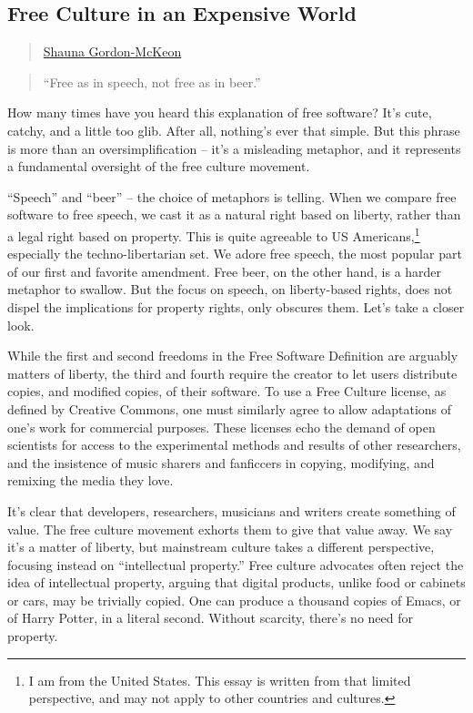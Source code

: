 \subsection{Free Culture in an Expensive
World}\label{free-culture-in-an-expensive-world}

\begin{quote}
\href{../appendix/attributions.html\#shauna-gordon-mckeon}{Shauna
Gordon-McKeon}
\end{quote}

\begin{quote}
``Free as in speech, not free as in beer.''
\end{quote}

How many times have you heard this explanation of free software? It's
cute, catchy, and a little too glib. After all, nothing's ever that
simple. But this phrase is more than an oversimplification -- it's a
misleading metaphor, and it represents a fundamental oversight of the
free culture movement.

``Speech'' and ``beer'' -- the choice of metaphors is telling. When we
compare free software to free speech, we cast it as a natural right
based on liberty, rather than a legal right based on property. This is
quite agreeable to US Americans,\footnote{I am from the United States.
  This essay is written from that limited perspective, and may not apply
  to other countries and cultures.} especially the techno-libertarian
set. We adore free speech, the most popular part of our first and
favorite amendment. Free beer, on the other hand, is a harder metaphor
to swallow. But the focus on speech, on liberty-based rights, does not
dispel the implications for property rights, only obscures them. Let's
take a closer look.

While the first and second freedoms in the Free Software Definition are
arguably matters of liberty, the third and fourth require the creator to
let users distribute copies, and modified copies, of their software. To
use a Free Culture license, as defined by Creative Commons, one must
similarly agree to allow adaptations of one's work for commercial
purposes. These licenses echo the demand of open scientists for access
to the experimental methods and results of other researchers, and the
insistence of music sharers and fanficcers in copying, modifying, and
remixing the media they love.

It's clear that developers, researchers, musicians and writers create
something of value. The free culture movement exhorts them to give that
value away. We say it's a matter of liberty, but mainstream culture
takes a different perspective, focusing instead on ``intellectual
property.'' Free culture advocates often reject the idea of intellectual
property, arguing that digital products, unlike food or cabinets or
cars, may be trivially copied. One can produce a thousand copies of
Emacs, or of Harry Potter, in a literal second. Without scarcity,
there's no need for property.

